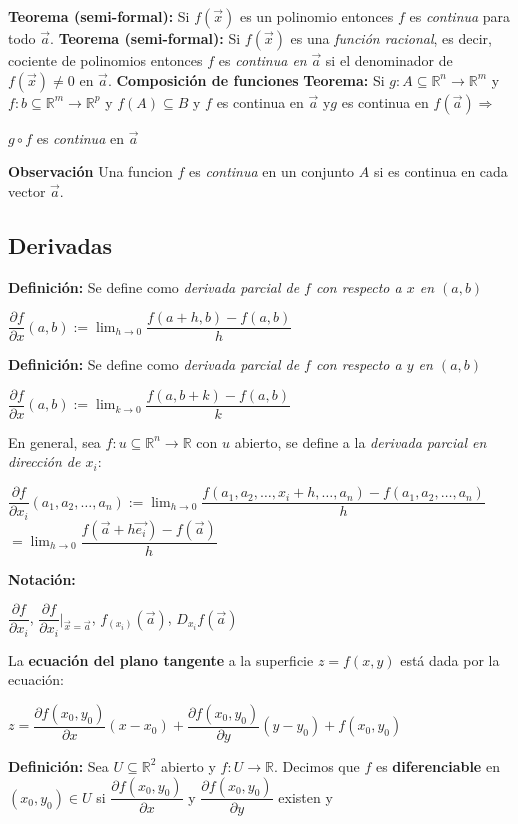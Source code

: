 \documentclass[12pt]{article}
\begin{document}
\noindent\textbf{Teorema (semi-formal):} Si $f(\vec{x})$ es un polinomio entonces $f$ es \emph{continua } para todo $\vec{a}$.\newline
\newline
\noindent\textbf{Teorema (semi-formal):} Si $f(\vec{x})$ es una \emph{función racional}, es decir, cociente de polinomios
entonces $f$ es \emph{continua en} $\vec{a}$ si el denominador de $f(\vec{x})\not=0$ en $\vec{a}$.\newline
\newline
\newpage
\noindent\textbf{Composición de funciones}\newline
\textbf{Teorema: }Si $g:A\subseteq\mathbb{R}^n\rightarrow \mathbb{R}^m$ y $f:b\subseteq\mathbb{R}^m\rightarrow \mathbb{R}^p$ y 
$f(A)\subseteq B$ y $f$ es continua en $\vec{a}$ y$g$ es continua en $f(\vec{a})\Longrightarrow$ 
\begin{center}
    $g\circ f$ es \emph{continua} en $\vec{a}$
\end{center}
\noindent \textbf{Observación} Una funcion $f$ es \emph{continua} en un conjunto $A$ si es continua en cada vector $\vec{a}$.
\newpage
\subsection*{Derivadas}
\noindent \textbf{Definición:} Se define como \emph{derivada parcial de $f$ con respecto a $x$ en $(a,b)$}
\begin{center}
    $\dfrac{\partial f}{\partial x}{(a,b)}:=\lim_{h\rightarrow0}{\dfrac{f(a+h,b)-f(a,b)}{h}}$
\end{center}
\noindent \textbf{Definición:} Se define como \emph{derivada parcial de $f$ con respecto a $y$ en $(a,b)$}
\begin{center}
    $\dfrac{\partial f}{\partial x}{(a,b)}:=\lim_{k\rightarrow0}{\dfrac{f(a,b+k)-f(a,b)}{k}}$
\end{center}
\noindent En general, sea $f:u\subseteq\mathbb{R}^n\rightarrow \mathbb{R}$ con $u$ abierto, 
se define a la \emph{derivada parcial en dirección de $x_i$}: 
\begin{center}
    $\dfrac{\partial f}{\partial x_i}{(a_1,a_2,\dots,a_n)}:=\lim_{h\rightarrow0}{\dfrac{f(a_1,a_2,\dots,x_i+h ,\dots,a_n)-f(a_1,a_2,\dots,a_n)}{h}}$
    \indent $=\lim_{h\rightarrow0}{\dfrac{f(\vec{a}+h\vec{e_i})-f(\vec{a})}{h}}$
\end{center}
\noindent \textbf{Notación: }
\begin{center}
    $\dfrac{\partial f}{\partial x_i}$, $\dfrac{\partial f}{\partial x_i}|_{\vec{x}=\vec{a}}$, $f_{(x_i)}(\vec{a})$, $D_{x_i}f(\vec{a})$
\end{center}
\noindent La \textbf{ecuación del plano tangente} a la superficie $z=f(x,y)$ está dada por la ecuación:
\begin{center}
    $z=\dfrac{\partial f(x_0,y_0)}{\partial x}(x-x_0)+\dfrac{\partial f(x_0,y_0)}{\partial y}(y-y_0)+f(x_0,y_0)$
\end{center}
\noindent \textbf{Definición:} Sea $U\subseteq\mathbb{R}^2$ abierto y $f:U\rightarrow\mathbb{R}$. Decimos que $f$ es 
\textbf{diferenciable} en $(x_0,y_0)\in U$ si $\dfrac{\partial f(x_0,y_0)}{\partial x}$ y $\dfrac{\partial f(x_0,y_0)}{\partial y}$
existen y 
\end{document}
